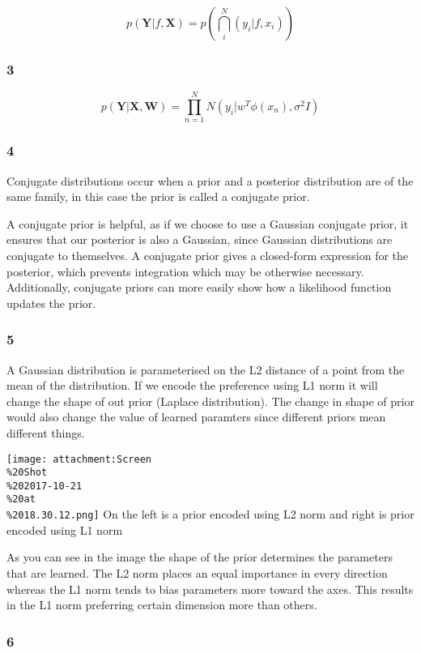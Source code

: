 \documentclass[11pt]{article}
\makeatletter
\def\maxwidth{\ifdim\Gin@nat@width>\linewidth\linewidth
    \else\Gin@nat@width\fi}
\let\Oldincludegraphics\includegraphics
\renewcommand{\includegraphics}[1]{\Oldincludegraphics[width=.8\maxwidth]{#1}}
\makeatother
\begin{document}
\[
p(\mathbf{Y} | f, \mathbf{X}) = p(\bigcap_i^N (y_i | f, x_i))
\]

    \subsubsection{3}\label{section}

\[
p(\mathbf{Y} | \mathbf{X}, \mathbf{W}) = \prod_{n=1}^{N} N(y_i | w^T\phi(x_n), \sigma^2 I)
\]

    \subsubsection{4}\label{section}

Conjugate distributions occur when a prior and a posterior distribution
are of the same family, in this case the prior is called a conjugate
prior.

A conjugate prior is helpful, as if we choose to use a Gaussian
conjugate prior, it ensures that our posterior is also a Gaussian, since
Gaussian distributions are conjugate to themselves. A conjugate prior
gives a closed-form expression for the posterior, which prevents
integration which may be otherwise necessary. Additionally, conjugate
priors can more easily show how a likelihood function updates the prior.

    \subsubsection{5}\label{section}

A Gaussian distribution is parameterised on the L2 distance of a point
from the mean of the distribution. If we encode the preference using L1
norm it will change the shape of out prior (Laplace distribution). The
change in shape of prior would also change the value of learned
paramters since different priors mean different things.

\texttt{[image: attachment:Screen\\\%20Shot\\\%202017-10-21\\\%20at\\\%2018.30.12.png]}
On the left is a prior encoded using L2 norm and right is prior encoded
using L1 norm

As you can see in the image the shape of the prior determines the
parameters that are learned. The L2 norm places an equal importance in
every direction whereas the L1 norm tends to bias parameters more toward
the axes. This results in the L1 norm preferring certain dimension more
than others.

    \subsubsection{6}\label{section}
\end{document}
